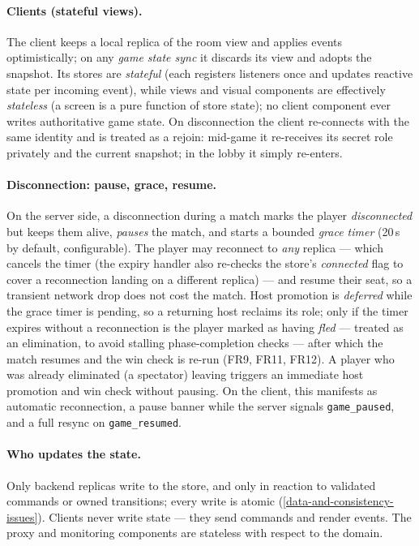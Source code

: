 \documentclass{scrartcl}
\begin{document}
\paragraph{Clients (stateful views).}
The client keeps a local replica of the room view and applies events
optimistically; on any \emph{game state sync} it discards its view and adopts the
snapshot. Its stores are \emph{stateful} (each registers listeners once and
updates reactive state per incoming event), while views and visual components are
effectively \emph{stateless} (a screen is a pure function of store state); no
client component ever writes authoritative game state. On disconnection the
client re-connects with the same identity and is treated as a rejoin: mid-game it
re-receives its secret role privately and the current snapshot; in the lobby it
simply re-enters.

\paragraph{Disconnection: pause, grace, resume.}
On the server side, a disconnection during a match marks the player
\emph{disconnected} but keeps them alive, \emph{pauses} the match, and starts a
bounded \emph{grace timer} (20\,s by default, configurable). The player may
reconnect to \emph{any} replica --- which cancels the timer (the expiry handler
also re-checks the store's \emph{connected} flag to cover a reconnection landing
on a different replica) --- and resume their seat, so a transient network drop does
not cost the match. Host promotion is \emph{deferred} while the grace timer is
pending, so a returning host reclaims its role; only if the timer expires without
a reconnection is the player marked as having \emph{fled} --- treated as an
elimination, to avoid stalling phase-completion checks --- after which the match
resumes and the win check is re-run (FR9, FR11, FR12). A player who was already
eliminated (a spectator) leaving triggers an immediate host promotion and win
check without pausing. On the client, this manifests as automatic reconnection, a
pause banner while the server signals \texttt{game\_paused}, and a full resync on
\texttt{game\_resumed}.

\paragraph{Who updates the state.}
Only backend replicas write to the store, and only in reaction to validated
commands or owned transitions; every write is atomic
(\cref{data-and-consistency-issues}). Clients never write state --- they send
commands and render events. The proxy and monitoring components are stateless
with respect to the domain.
\end{document}
